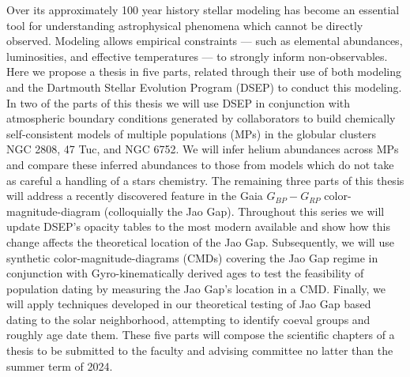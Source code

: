 Over its approximately 100 year history stellar modeling has become an
essential tool for understanding astrophysical phenomena which cannot be
directly observed. Modeling allows empirical constraints --- such as
elemental abundances, luminosities, and effective temperatures --- to
strongly inform non-observables. Here we propose a thesis in five parts,
related through their use of both modeling and the Dartmouth Stellar
Evolution Program (DSEP) to conduct this modeling. In two of the parts of
this thesis we will use DSEP in conjunction with atmospheric boundary
conditions generated by collaborators to build chemically self-consistent
models of multiple populations (MPs) in the globular clusters NGC 2808, 47
Tuc, and NGC 6752. We will infer helium abundances across MPs and compare
these inferred abundances to those from models which do not take as careful
a handling of a stars chemistry. The remaining three parts of this thesis
will address a recently discovered feature in the Gaia $G_{BP} - G_{RP}$
color-magnitude-diagram (colloquially the Jao Gap). Throughout this series
we will update DSEP's opacity tables to the most modern available and show
how this change affects the theoretical location of the Jao Gap.
Subsequently, we will use synthetic color-magnitude-diagrams (CMDs)
covering the Jao Gap regime in conjunction with Gyro-kinematically derived
ages to test the feasibility of population dating by measuring the Jao
Gap's location in a CMD. Finally, we will apply techniques developed in our
theoretical testing of Jao Gap based dating to the solar neighborhood,
attempting to identify coeval groups and roughly age date them. These five
parts will compose the scientific chapters of a thesis to be submitted to
the faculty and advising committee no latter than the summer term of 2024.
